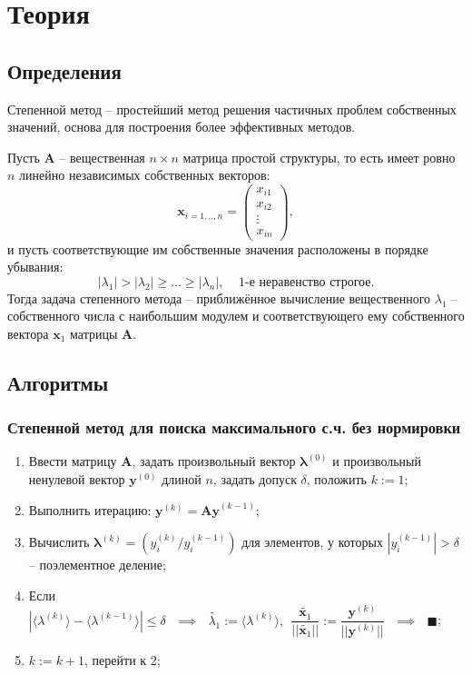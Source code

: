 \section{Теория}

\subsection{Определения}
Степенной метод -- простейший метод решения частичных проблем собственных значений, основа для построения более эффективных методов.

Пусть $\mathbf{A}$ -- вещественная $n\times n$ матрица простой структуры, то есть имеет ровно $n$ линейно независимых собственных векторов:
\begin{equation}
    \mathbf{x}_{i=1,..,n} =
    \begin{pmatrix}
        x_{i1}\\ x_{i2} \\ \vdots \\ x_{in}
    \end{pmatrix},
\end{equation}
и пусть соответствующие им собственные значения расположены в порядке убывания:
\begin{equation}
    |\lambda_1| > |\lambda_2| \ge \ldots \ge |\lambda_n|,  ~~~~~ \text{1-е неравенство строгое.}
\end{equation}
Тогда задача степенного метода -- приближённое вычисление вещественного  $\lambda_1$ -- собственного числа с наибольшим модулем и соответствующего ему собственного вектора $\mathbf{x}_1$ матрицы  $\mathbf{A}$.

\subsection{Алгоритмы}
\subsubsection{Степенной метод для поиска максимального с.ч. без нормировки}
\begin{enumerate}
\item Ввести матрицу $\mathbf{A}$, задать произвольный вектор $\mathbf{\lambda}^{(0)}$ и произвольный ненулевой вектор $\mathbf{y}^{(0)}$ длиной $n$, задать допуск $\delta$, положить $k:=1$;

\item Выполнить итерацию: $\mathbf{y}^{(k)} = \mathbf{Ay}^{(k-1)}$;

\item Вычислить $\mathbf{\lambda}^{(k)} = \left( y^{(k)}_i / y^{(k-1)}_i \right)$ для элементов, у которых $ |y^{(k-1)}_i| > \delta$ -- поэлементное деление;

\item Если $|\langle\lambda^{(k)}\rangle-\langle\lambda^{(k-1)}\rangle| \le \delta ~~~ \implies ~~~
\tilde{\lambda_1} := \langle\lambda^{(k)}\rangle, ~~
\dfrac{\tilde{\mathbf{x}_1}}{||\tilde{\mathbf{x}_1}||} := \dfrac{\mathbf{y}^{(k)}}{||\mathbf{y}^{(k)}||} ~~~
\implies ~~~ \blacksquare$;

\item $k:= k+1$, перейти к 2;
\end{enumerate}


